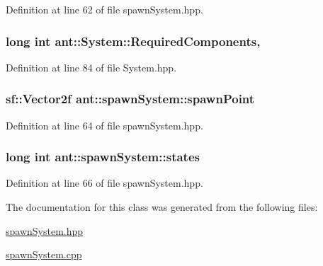 Definition at line 62 of file spawn\+System.\+hpp.

\hypertarget{classant_1_1_system_a4ef41cfc496e41ac6730f90629524ec7}{
\subsubsection[{Required\+Components}]{\setlength{\rightskip}{0pt plus 5cm}long int ant\+::\+System\+::\+Required\+Components\hspace{0.3cm}{\ttfamily [protected]}, {\ttfamily [inherited]}}}\label{classant_1_1_system_a4ef41cfc496e41ac6730f90629524ec7}


Definition at line 84 of file System.\+hpp.

\hypertarget{classant_1_1spawn_system_ae44b8fd02249453a7c4b4390bc7e32c7}{
\subsubsection[{spawn\+Point}]{\setlength{\rightskip}{0pt plus 5cm}sf\+::\+Vector2f ant\+::spawn\+System\+::spawn\+Point\hspace{0.3cm}{\ttfamily [private]}}}\label{classant_1_1spawn_system_ae44b8fd02249453a7c4b4390bc7e32c7}


Definition at line 64 of file spawn\+System.\+hpp.

\hypertarget{classant_1_1spawn_system_a76dbde294f95b3aadd2b1df30699ebf1}{
\subsubsection[{states}]{\setlength{\rightskip}{0pt plus 5cm}long int ant\+::spawn\+System\+::states\hspace{0.3cm}{\ttfamily [private]}}}\label{classant_1_1spawn_system_a76dbde294f95b3aadd2b1df30699ebf1}


Definition at line 66 of file spawn\+System.\+hpp.



The documentation for this class was generated from the following files\+:\begin{DoxyCompactItemize}
\item 
\hyperlink{spawn_system_8hpp}{spawn\+System.\+hpp}\item 
\hyperlink{spawn_system_8cpp}{spawn\+System.\+cpp}\end{DoxyCompactItemize}
